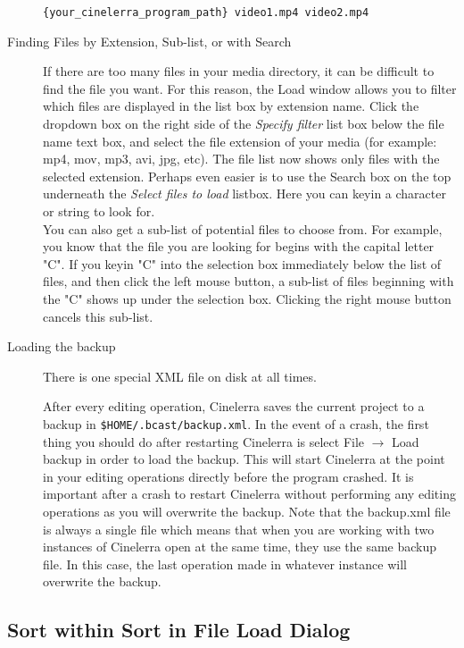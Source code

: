 \begin{description}
    \texttt{\{your\_cinelerra\_program\_path\} video1.mp4 video2.mp4}
    \item[Finding Files by Extension, Sub-list, or with Search] If there are too many files in your media directory, it can be difficult to find the file you want. For this reason, the Load window allows you to filter which files are displayed in the list box by extension name. Click the dropdown box on the right side of the \textit{Specify filter} list box below the file name text box, and select the file extension of your media (for example: mp4, mov, mp3, avi, jpg, etc). The file list now shows only files with the selected extension.  Perhaps even easier is to use the Search box on the top underneath the \textit{Select files to load} listbox.  Here you can keyin a character or string to look for. \\
    You can also get a sub-list of potential files to choose from. For example, you know that the file you are looking for begins with the capital letter "C". If you keyin "C" into the selection box immediately below the list of files, and then click the left mouse button, a sub-list of files beginning with the "C" shows up under the selection box. Clicking the right mouse button cancels this sub-list.
    \item[Loading the backup] There is one special XML file on disk at all times. 

        After every editing operation, Cinelerra saves the current project to a backup in  \texttt{\$HOME/.bcast/backup.xml}. 
        In the event of a crash, the first thing you should do after restarting Cinelerra is select File $\rightarrow$ Load backup in order to load the backup. 
        This will start Cinelerra at the point in your editing operations directly before the program crashed. 
        It is important after a crash to restart Cinelerra without performing any editing operations as you will overwrite the backup. 
        Note that the backup.xml file is always a single file which means that when you are working with two instances of Cinelerra open at the same time, they use the same backup file. 
        In this case, the last operation made in whatever instance will overwrite the backup.
\end{description}

\subsection{Sort within Sort in File Load Dialog}%
\label{sub:sort_within_sort_file_load_dialog}

